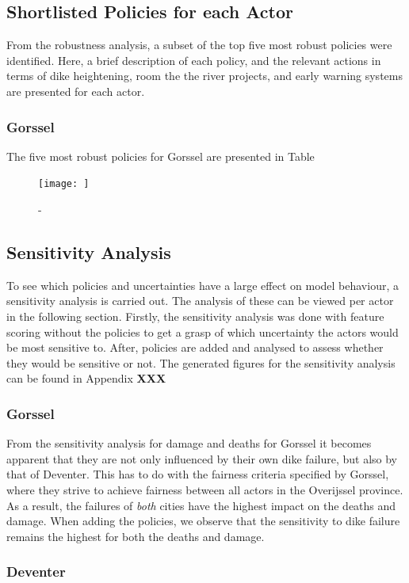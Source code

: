 \subsection{Shortlisted Policies for each Actor}
From the robustness analysis, a subset of the top five most robust policies were identified. Here, a brief description of each policy, and the relevant actions in terms of dike heightening, room the the river projects, and early warning systems are presented for each actor.
\subsubsection{Gorssel}
The five most robust policies for Gorssel are presented in Table
\begin{figure}[h]
    \centering
    \texttt{[image: ]}
    \caption{-}
    \label{fig:msmordm}
\end{figure}


\subsection{Sensitivity Analysis}

To see which policies and uncertainties have a large effect on model behaviour, a sensitivity analysis is carried out. The analysis of these can be viewed per actor in the following section. Firstly, the sensitivity analysis was done with feature scoring without the policies to get a grasp of which uncertainty the actors would be most sensitive to. After, policies are added and analysed to assess whether they would be sensitive or not. The generated figures for the sensitivity analysis can be found in Appendix \textbf{XXX}

\subsubsection{Gorssel}

From the sensitivity analysis for damage and deaths for Gorssel it becomes apparent that they are not only influenced by their own dike failure, but also by that of Deventer. This has to do with the fairness criteria specified by Gorssel, where they strive to achieve fairness between all actors in the Overijssel province. As a result, the failures of \textit{both} cities have the highest impact on the deaths and damage. When adding the policies, we observe that the sensitivity to dike failure remains the highest for both the deaths and damage. 

\subsubsection{Deventer}

